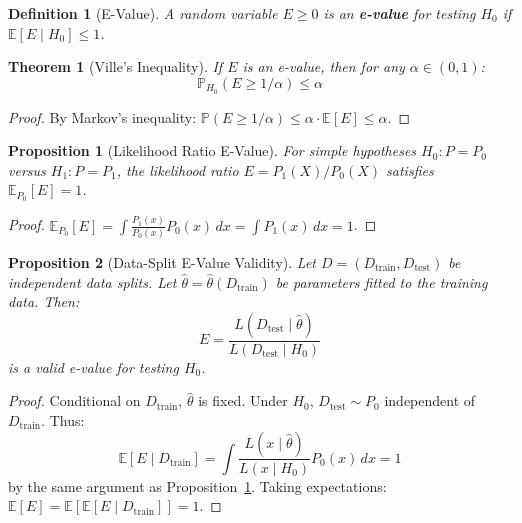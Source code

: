 \documentclass[11pt,a4paper]{article}
\newtheorem{definition}{Definition}
\newtheorem{theorem}{Theorem}
\newtheorem{proposition}{Proposition}
\newcommand{\E}{\mathbb{E}}
\newcommand{\Prob}{\mathbb{P}}
\begin{document}
\begin{definition}[E-Value]
A random variable $E \geq 0$ is an \textbf{e-value} for testing $H_0$ if $\E[E \mid H_0] \leq 1$.
\end{definition}

\begin{theorem}[Ville's Inequality]
\label{thm:ville}
If $E$ is an e-value, then for any $\alpha \in (0,1)$:
\begin{equation}
\Prob_{H_0}(E \geq 1/\alpha) \leq \alpha
\end{equation}
\end{theorem}

\begin{proof}
By Markov's inequality: $\Prob(E \geq 1/\alpha) \leq \alpha \cdot \E[E] \leq \alpha$.
\end{proof}

\begin{proposition}[Likelihood Ratio E-Value]
\label{prop:lr}
For simple hypotheses $H_0: P = P_0$ versus $H_1: P = P_1$, the likelihood ratio $E = P_1(X)/P_0(X)$ satisfies $\E_{P_0}[E] = 1$.
\end{proposition}

\begin{proof}
$\E_{P_0}[E] = \int \frac{P_1(x)}{P_0(x)} P_0(x) \, dx = \int P_1(x) \, dx = 1$.
\end{proof}

\begin{proposition}[Data-Split E-Value Validity]
\label{prop:split}
Let $D = (D_{\text{train}}, D_{\text{test}})$ be independent data splits. Let $\hat{\theta} = \hat{\theta}(D_{\text{train}})$ be parameters fitted to the training data. Then:
\begin{equation}
E = \frac{L(D_{\text{test}} \mid \hat{\theta})}{L(D_{\text{test}} \mid H_0)}
\end{equation}
is a valid e-value for testing $H_0$.
\end{proposition}

\begin{proof}
Conditional on $D_{\text{train}}$, $\hat{\theta}$ is fixed. Under $H_0$, $D_{\text{test}} \sim P_0$ independent of $D_{\text{train}}$. Thus:
\begin{equation}
\E[E \mid D_{\text{train}}] = \int \frac{L(x \mid \hat{\theta})}{L(x \mid H_0)} P_0(x) \, dx = 1
\end{equation}
by the same argument as Proposition~\ref{prop:lr}. Taking expectations: $\E[E] = \E[\E[E \mid D_{\text{train}}]] = 1$.
\end{proof}
\end{document}
